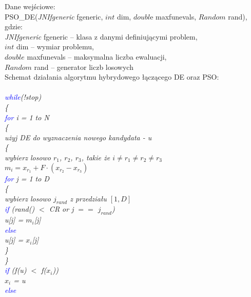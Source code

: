 \documentclass{article}
\begin{document}
Dane wejściowe:\\
PSO\_DE(\textit{JNIfgeneric} fgeneric, $int$ dim, $doubl$e maxfunevals, $Random$ rand), gdzie:\\
\textit{JNIfgeneric} fgeneric – klasa z danymi definiującymi problem,\\
$int$ dim – wymiar problemu,\\
$double$ maxfunevals – maksymalna liczba ewaluacji,\\
$Random$ rand – generator liczb losowych\\

Schemat działania algorytmu hybrydowego łączącego DE oraz PSO:\\
\textit{
\\
\textcolor{blue}{while}(!stop)\\
\{\\
\indent	\textcolor{blue}{for} i = 1 to N\\
\indent	\{\\
\indent\indent użyj DE do wyznaczenia nowego kandydata - u\\
\indent\indent \{\\
\indent\indent		wybierz losowo $r_1$, $r_2$, $r_3$, takie że  $i \neq r_1 \neq r_2 \neq r_3$\\
\indent\indent\indent 		$m_i = x_{r_1} + F \cdot  (x_{r_2} - x_{r_3})$\\
\indent\indent\indent		\textcolor{blue}{for} j = 1 to D\\
\indent\indent\indent		\{\\
\indent\indent\indent\indent			wybierz losowo $j_{rand}$ z przedziału $[1, D]$\\
\indent\indent\indent\indent			\textcolor{blue}{if} (rand() $<$ CR or j $==$ $j_{rand}$)\\
\indent\indent\indent\indent\indent				u[j] = $m_i$[j]\\
\indent\indent\indent\indent			\textcolor{blue}{else}\\
\indent\indent\indent\indent\indent				u[j] = $x_i$[j]\\
\indent\indent\indent		\}\\
\indent\indent \}\\
\indent\indent		\textcolor{blue}{if} (f(u) $<$ f($x_i$))\\
\indent\indent\indent			$x_i$ = u\\
\indent\indent		\textcolor{blue}{else}\\
}
\end{document}

